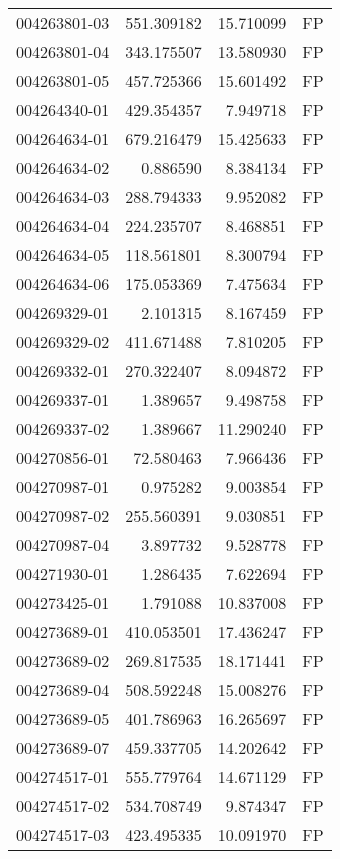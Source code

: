 \begin{tabular}{lrrl}
004263801-03 &  551.309182 &    15.710099 &   FP \\
004263801-04 &  343.175507 &    13.580930 &   FP \\
004263801-05 &  457.725366 &    15.601492 &   FP \\
004264340-01 &  429.354357 &     7.949718 &   FP \\
004264634-01 &  679.216479 &    15.425633 &   FP \\
004264634-02 &    0.886590 &     8.384134 &   FP \\
004264634-03 &  288.794333 &     9.952082 &   FP \\
004264634-04 &  224.235707 &     8.468851 &   FP \\
004264634-05 &  118.561801 &     8.300794 &   FP \\
004264634-06 &  175.053369 &     7.475634 &   FP \\
004269329-01 &    2.101315 &     8.167459 &   FP \\
004269329-02 &  411.671488 &     7.810205 &   FP \\
004269332-01 &  270.322407 &     8.094872 &   FP \\
004269337-01 &    1.389657 &     9.498758 &   FP \\
004269337-02 &    1.389667 &    11.290240 &   FP \\
004270856-01 &   72.580463 &     7.966436 &   FP \\
004270987-01 &    0.975282 &     9.003854 &   FP \\
004270987-02 &  255.560391 &     9.030851 &   FP \\
004270987-04 &    3.897732 &     9.528778 &   FP \\
004271930-01 &    1.286435 &     7.622694 &   FP \\
004273425-01 &    1.791088 &    10.837008 &   FP \\
004273689-01 &  410.053501 &    17.436247 &   FP \\
004273689-02 &  269.817535 &    18.171441 &   FP \\
004273689-04 &  508.592248 &    15.008276 &   FP \\
004273689-05 &  401.786963 &    16.265697 &   FP \\
004273689-07 &  459.337705 &    14.202642 &   FP \\
004274517-01 &  555.779764 &    14.671129 &   FP \\
004274517-02 &  534.708749 &     9.874347 &   FP \\
004274517-03 &  423.495335 &    10.091970 &   FP \\

\end{tabular}
